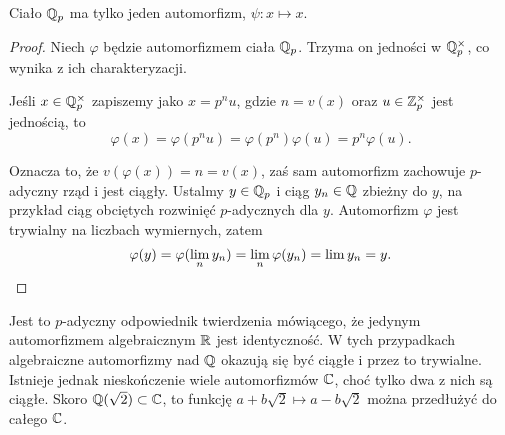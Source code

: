 \begin{fakt}
	Ciało $\mathbb Q_p$ ma tylko jeden automorfizm, $\psi \colon x \mapsto x$.
\end{fakt}

\begin{proof}
	Niech $\varphi$ będzie automorfizmem ciała $\mathbb Q_p$.
	Trzyma on jedności w $\mathbb Q_p^\times$, co wynika z ich charakteryzacji.

	Jeśli $x \in \mathbb Q_p^\times$ zapiszemy jako $x = p^nu$, gdzie $n = v(x)$ oraz $u \in \mathbb Z_p^\times$ jest jednością, to
	\[
		\varphi(x) = \varphi(p^nu) = \varphi(p^n) \varphi(u) = p^n\varphi(u).
	\]

	Oznacza to, że $v(\varphi(x)) = n = v(x)$, zaś sam automorfizm zachowuje $p$-adyczny rząd i jest ciągły.
	Ustalmy $y \in \mathbb Q_p$ i ciąg $y_n \in \mathbb Q$ zbieżny do $y$, na przykład ciąg obciętych rozwinięć $p$-adycznych dla $y$.
	Automorfizm $\varphi$ jest trywialny na liczbach wymiernych, zatem
	\[
		\varphi(y) = \varphi(\lim_n y_n) = \lim_n \varphi(y_n) = \lim y_n = y. \qedhere
	\]
\end{proof}

Jest to $p$-adyczny odpowiednik twierdzenia mówiącego, że jedynym automorfizmem algebraicznym  $\mathbb R$ jest identyczność.
W tych przypadkach algebraiczne automorfizmy nad $\mathbb Q$ okazują się być ciągłe i przez to trywialne.
Istnieje jednak nieskończenie wiele automorfizmów $\mathbb C$, choć tylko dwa z nich są ciągłe.
Skoro $\mathbb Q(\sqrt 2) \subset \mathbb C$, to funkcję $a + b\sqrt 2 \mapsto a - b\sqrt 2$ można przedłużyć do całego $\mathbb C$.